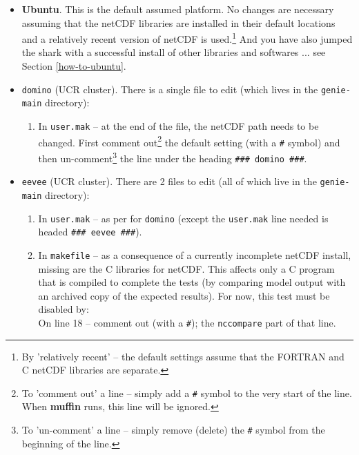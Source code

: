 \documentclass[11pt,fleqn]{book} %
\begin{document}
\begin{itemize}

\vspace{1mm}
\item \textbf{Ubuntu}. This is the default assumed platform. No changes are necessary assuming that the netCDF libraries are installed in their default locations and a relatively recent version of netCDF is used.\footnote{By 'relatively recent' -- the default settings assume that the FORTRAN and C netCDF libraries are separate.} And you have also jumped the shark with a successful install of other libraries and softwares ... see Section \ref{how-to-ubuntu}.

\vspace{1mm}
\item \texttt{domino} (UCR cluster). There is a single file to edit (which lives in the \texttt{genie-main} directory):
\begin{enumerate}[noitemsep]
\item In \texttt{user.mak} -- at the end of the file, the netCDF path needs to be changed. First comment out\footnote{To 'comment out' a line -- simply add a \texttt{\#} symbol to the very start of the line. When \textbf{muffin} runs, this line will be ignored.} the default setting (with a \texttt{\#} symbol) and then un-comment\footnote{To 'un-comment' a line -- simply remove (delete) the \texttt{\#} symbol from the beginning of the line.} the line under the heading \texttt{\#\#\# domino \#\#\#}.
\end{enumerate}

\vspace{1mm}
\item \texttt{eevee} (UCR cluster). There are 2 files to edit (all of which live in the \texttt{genie-main} directory):
\begin{enumerate}[noitemsep]
\item In \texttt{user.mak} -- as per for \texttt{domino} (except the \texttt{user.mak} line needed is headed \texttt{\#\#\# eevee \#\#\#}).
\item In \texttt{makefile} -- as a consequence of a currently incomplete netCDF install, missing are the C libraries for netCDF. This affects only a C program that is compiled to complete the tests (by comparing model output with an archived copy of the expected results). For now, this test must be disabled by:
\\On line 18 -- comment out (with a \texttt{\#}); the \texttt{nccompare} part of that line.
\end{enumerate}


\end{itemize}
\end{document}
